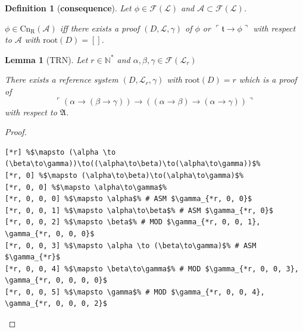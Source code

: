 \documentclass[10pt]{article}
\theoremstyle{plain}
\newtheorem{definition}[theorem]{Definition}
\newtheorem{lemma}[theorem]{Lemma}
\newcommand{\N}{\mathbb{N}}
\newcommand{\F}{\mathcal{F}}
\renewcommand{\root}{\text{root}}
\newcommand{\truth}{\mathfrak{t}}
\newcommand{\Cnr}{\text{Cn}_\text{R}}
\renewcommand{\L}{\mathscr{L}}
\begin{document}
\begin{definition}[\textbf{consequence}]
Let $\phi\in\F(\L)$ and $\mathcal{A}\subset \F(\L)$.
 
$\phi\in\Cnr(\mathcal{A})$ iff there exists a proof $(D, \L, \gamma)$ of $\phi$ or 
$\ulcorner \truth\to\phi \urcorner$ with respect to $\mathcal{A}$ with $\root(D) = []$.
\end{definition}

\begin{lemma}[TRN]
\label{TRN}
Let $r\in \N^*$ and $\alpha, \beta, \gamma \in \F(\L_r)$

There exists a reference system $(D, \L_r, \gamma)$ with $\root(D) = r$ which is a proof of 
\begin{equation}
\ulcorner (\alpha \to (\beta\to\gamma))\to((\alpha\to\beta)\to(\alpha\to\gamma)) \urcorner
\end{equation}
with respect to $\mathfrak{A}$.
\end{lemma}
\begin{proof}
\begin{lstlisting}[texcl, escapechar=\%]
[*r] %$\mapsto (\alpha \to (\beta\to\gamma))\to((\alpha\to\beta)\to(\alpha\to\gamma))$%
[*r, 0] %$\mapsto (\alpha\to\beta)\to(\alpha\to\gamma)$%
[*r, 0, 0] %$\mapsto \alpha\to\gamma$%
[*r, 0, 0, 0] %$\mapsto \alpha$% # ASM $\gamma_{*r, 0, 0}$
[*r, 0, 0, 1] %$\mapsto \alpha\to\beta$% # ASM $\gamma_{*r, 0}$
[*r, 0, 0, 2] %$\mapsto \beta$% # MOD $\gamma_{*r, 0, 0, 1}, \gamma_{*r, 0, 0, 0}$
[*r, 0, 0, 3] %$\mapsto \alpha \to (\beta\to\gamma)$% # ASM $\gamma_{*r}$
[*r, 0, 0, 4] %$\mapsto \beta\to\gamma$% # MOD $\gamma_{*r, 0, 0, 3}, \gamma_{*r, 0, 0, 0, 0}$
[*r, 0, 0, 5] %$\mapsto \gamma$% # MOD $\gamma_{*r, 0, 0, 4}, \gamma_{*r, 0, 0, 0, 2}$
\end{lstlisting}
\end{proof}
\end{document}
